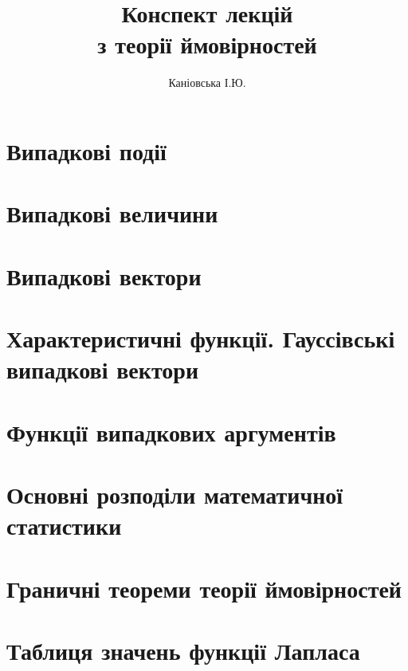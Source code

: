 \documentclass{report}
\author{\Huge Каніовська І.Ю.}
\title{
    \textbf{\fontsize{40}{48}\selectfont Конспект лекцій \\з теорії ймовірностей}
    }
\date{}
\begin{document}
 
    \maketitle
    \tableofcontents
    \chapter{Випадкові події}
    \chapter{Випадкові величини}
    \chapter{Випадкові вектори}
    \chapter{Характеристичні функції. Гауссівські випадкові вектори}
    \chapter{Функції випадкових аргументів}
    \chapter{Основні розподіли математичної статистики}
    \chapter{Граничні теореми теорії ймовірностей}
        
    \chapter*{Таблиця значень функції Лапласа}
        
\end{document}
